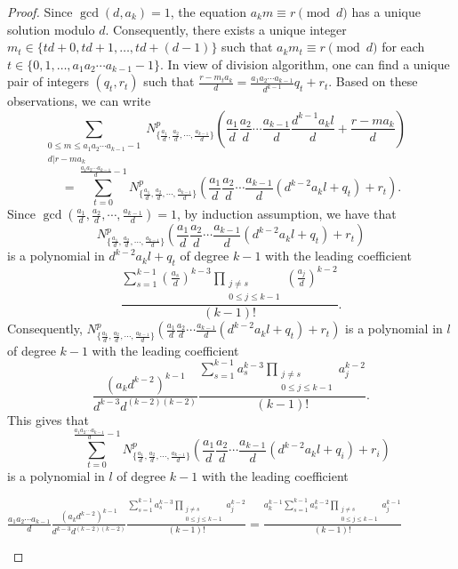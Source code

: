 \documentclass[11pt]{article}
\begin{document}
\begin{proof}
Since $\gcd(d,a_k)=1$, the equation $a_km\equiv r\pmod d$ has a unique solution modulo $d$. Consequently, there exists a unique integer $m_t\in\{td+0,td+1,\ldots,td+(d-1)\}$ such that $a_km_t\equiv r\pmod d$ for each $t\in\{0,1,\ldots , a_1a_2\cdots a_{k-1}-1\}$. In view of division algorithm, one can find a unique pair of integers $(q_t,r_t)$ such that $\frac{r-m_ta_k}{d}=\frac{a_1a_2\cdots a_{k-1}}{d^{k-1}}q_t+r_t$. Based on these observations, we can write 
\[\sum_{\substack{0\leq m\leq a_1a_2\cdots a_{k-1}-1\\ d|r-ma_k}}N_{\{\frac{a_1}{d},\frac{a_2}{d},\cdots ,\frac{a_{k-1}}{d}\}}^p\left(\frac{a_1}{d}\frac{a_2}{d}\cdots \frac{a_{k-1}}{d}\frac{d^{k-1}a_kl}{d}+\frac{r-ma_k}{d}\right)\ \ \ \ \ 
\]
\[=\sum_{t=0}^{\frac{a_1a_2\cdots a_{k-1}}{d}-1}N_{\{\frac{a_1}{d},\frac{a_2}{d},\cdots ,\frac{a_{k-1}}{d}\}}^p\left(\frac{a_1}{d}\frac{a_2}{d}\cdots \frac{a_{k-1}}{d}\left(d^{k-2}a_kl+q_t\right)+r_t\right).
\]
Since $\gcd\left(\frac{a_1}{d},\frac{a_2}{d},\cdots ,\frac{a_{k-1}}{d}\right)=1$, by induction assumption, we have that 
\[
N_{\{\frac{a_1}{d},\frac{a_2}{d},\cdots ,\frac{a_{k-1}}{d}\}}^p\left(\frac{a_1}{d}\frac{a_2}{d}\cdots \frac{a_{k-1}}{d}\left(d^{k-2}a_kl+q_t\right)+r_t\right)
\]
is a polynomial in $d^{k-2}a_kl+q_t$ of degree $k-1$ with the leading coefficient 
\[\frac{\sum_{s=1}^{k-1}\left(\frac{a_s}{d}\right)^{k-3}\prod_{\substack{j\neq s\\ 0\leq j\leq k-1}}\left(\frac{a_j}{d}\right)^{k-2}}{(k-1)!}.
\]
Consequently, $N_{\{\frac{a_1}{d},\frac{a_2}{d},\cdots ,\frac{a_{k-1}}{d}\}}^p\left(\frac{a_1}{d}\frac{a_2}{d}\cdots \frac{a_{k-1}}{d}\left(d^{k-2}a_kl+q_t\right)+r_t\right)$ is a polynomial in $l$ of degree $k-1$ with the leading coefficient \[\frac{(a_kd^{k-2})^{k-1}}{d^{k-3}d^{(k-2)(k-2)}}\frac{\sum_{s=1}^{k-1}a_s^{k-3}\prod_{\substack{j\neq s\\ 0\leq j\leq k-1}}a_j^{k-2}}{(k-1)!}.\]
This gives that \[\sum_{t=0}^{\frac{a_1a_2\cdots a_{k-1}}{d}-1}N_{\{\frac{a_1}{d},\frac{a_2}{d},\cdots ,\frac{a_{k-1}}{d}\}}^p\left(\frac{a_1}{d}\frac{a_2}{d}\cdots \frac{a_{k-1}}{d}\left(d^{k-2}a_kl+q_i\right)+r_i\right)\]
is a polynomial in $l$ of degree $k-1$ with the leading coefficient 
\begin{flushleft}
$\frac{a_1a_2\cdots a_{k-1}}{d}\frac{(a_kd^{k-2})^{k-1}}{d^{k-3}d^{(k-2)(k-2)}}\frac{\sum_{s=1}^{k-1}a_s^{k-3}\prod_{\substack{j\neq s\\ 0\leq j\leq k-1}}a_j^{k-2}}{(k-1)!}
=\frac{a_k^{k-1}\sum_{s=1}^{k-1}a_s^{k-2}\prod_{\substack{j\neq s\\ 0\leq j\leq k-1}}a_j^{k-1}}{(k-1)!}$

\end{flushleft}
\end{proof}
\end{document}
